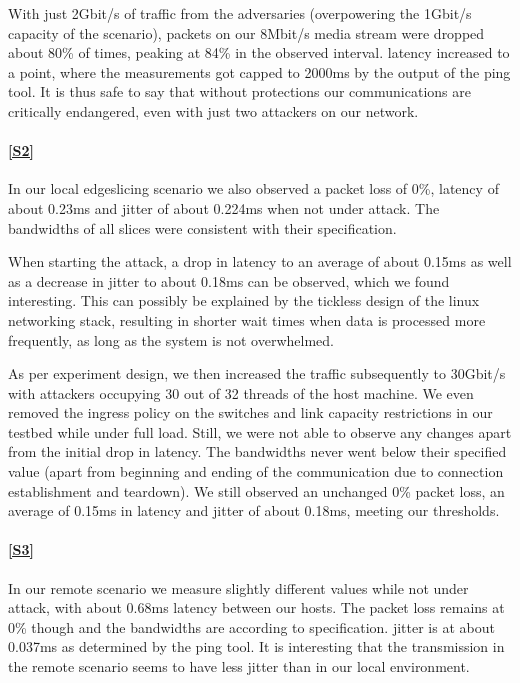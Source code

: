 \begin{description}[style=multiline, labelwidth=0.7cm]
    With just 2Gbit/s of traffic from the adversaries (overpowering the 1Gbit/s capacity of the scenario), packets on our 8Mbit/s media stream were dropped about 80\% of times, peaking at 84\% in the observed interval. \Gls{latency} increased to a point, where the measurements got capped to 2000ms by the output of the ping tool. It is thus safe to say that without protections our communications are critically endangered, even with just two attackers on our network.

    \paragraph{\ref{S2}} In our local edgeslicing scenario we also observed a packet loss of 0\%, \gls{latency} of about 0.23ms and \gls{jitter} of about 0.224ms when not under attack. The \gls{bandwidth}s of all slices were consistent with their specification.

    When starting the attack, a drop in \gls{latency} to an average of about 0.15ms as well as a decrease in \gls{jitter} to about 0.18ms can be observed, which we found interesting. This can possibly be explained by the tickless design of the linux networking stack, resulting in shorter wait times when data is processed more frequently, as long as the system is not overwhelmed.

    As per experiment design, we then increased the traffic subsequently to 30Gbit/s with attackers occupying 30 out of 32 threads of the host machine. We even removed the ingress policy on the switches and link capacity restrictions in our testbed while under full load. Still, we were not able to observe any changes apart from the initial drop in \gls{latency}.
    The \gls{bandwidth}s never went below their specified value (apart from beginning and ending of the communication due to connection establishment and teardown). We still observed an unchanged 0\% packet loss, an average of 0.15ms in \gls{latency} and \gls{jitter} of about 0.18ms, meeting our thresholds.

    \paragraph{\ref{S3}} In our remote scenario we measure slightly different values while not under attack, with about 0.68ms \gls{latency} between our hosts. The packet loss remains at 0\% though and the \gls{bandwidth}s are according to specification. \Gls{jitter} is at about 0.037ms as determined by the ping tool. It is interesting that the transmission in the remote scenario seems to have less \gls{jitter} than in our local environment.


\end{description}
